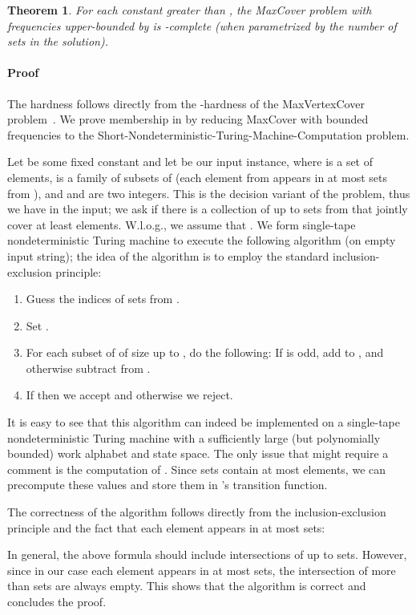 \documentclass[11pt]{article}
\newtheorem{theorem}{Theorem}
\newenvironment{proof}{\paragraph{Proof}}{\hfill\medskip}
\begin{document}
\begin{theorem}
  For each constant  greater than , the MaxCover problem with
  frequencies upper-bounded by  is -complete (when
  parametrized by the number of sets in the solution).
\end{theorem}
\begin{proof}
  The hardness follows directly from the -hardness of the
  MaxVertexCover problem~\cite{guo-nie-wer:j:vertex-cover-variants}.
  We prove membership in  by reducing MaxCover with bounded
  frequencies to the Short-Nondeterministic-Turing-Machine-Computation
  problem.

  Let  be some fixed constant and let  be our
  input instance, where  is a set of elements,  is a family of subsets of  (each element from 
  appears in at most  sets from ), and  and  are two
  integers. This is the decision variant of the problem, thus we have
   in the input; we ask if there is a collection of up to  sets
  from  that jointly cover at least  elements.  W.l.o.g., we
  assume that . We form single-tape nondeterministic Turing
  machine  to execute the following algorithm (on empty input
  string); the idea of the algorithm is to employ the standard
  inclusion-exclusion principle:
  \begin{enumerate}
  \item Guess the indices  of  sets from .
  \item Set .
  \item For each subset  of  of size up to
    , do the following: If  is odd, add  to , and otherwise subtract  from .
  \item If  then we accept and otherwise we reject.
  \end{enumerate}
  It is easy to see that this algorithm can indeed be implemented on a
  single-tape nondeterministic Turing machine with a sufficiently
  large (but polynomially bounded) work alphabet and state space.  The
  only issue that might require a comment is the computation of
  . Since sets  contain at most 
  elements, we can precompute these values and store them in 's
  transition function.

  The correctness of the algorithm follows directly from the inclusion-exclusion
  principle and the fact that each element appears in at most  sets: 

In general, the above formula should include intersections of up to
   sets. However, since in our case each element appears in at most
   sets, the intersection of more than  sets are always
  empty. This shows that the algorithm is correct and concludes the
  proof.~
\end{proof}
\end{document}
